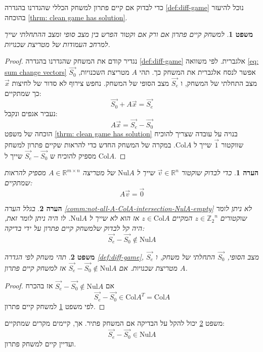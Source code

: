 \documentclass[12pt,leqno]{article}
\theoremstyle{theoremdd}
\newtheorem{theorem}{משפט}[section]
\newtheorem{comm}{הערה}[section]
\newcommand{\Zn}{{\mathbb{Z}_2}^n}
\newcommand{\Col}{\mathrm{Col}}
\newcommand{\Nul}{\mathrm{Nul}}
\begin{document}
כדי לבדוק אם קיים פתרון למשחק הכללי שהגדרנו 
בהגדרה 
\ref{def:diff-game}
נוכל להיעזר בהוכחה
\ref{thrm: clean game has solution}.
\begin{theorem}
    \label{thm:exist-sol-by-ColA}
    למשחק קיים פתרון אם ורק אם 
    וקטור הפרש בין מצב סופי ומצב ההתחלתי שייך למרחב 
    העמודות של מטריצת שכנויות.
\end{theorem}
\begin{proof}
    נגדיר קודם את המשחק 
    שהגדרנו 
    בהגדרה 
    \ref{def:diff-game}
    אלגברית.
    לפי משוואה 
    \ref{eq: sum change vectors}
    אפשר לנסח אלגברית את המשחק כך.
    תהי 
    $A$
    מטריצת השכנויות,
    $\vec{S_0}$
    מצב התחלתי של המשחק,
    ו
    $\vec{S_e}$
    מצב הסופי של המשחק.
    נחפש צירוף 
    לא סדור של לחיצות 
    $\vec x$
    כך שמתקיים:
    \[
        \vec{S_0} + A\vec{x} = \vec{S_e}
    \]
    נעביר אגפים ונקבל:
    \[
         A\vec{x} = \vec{S_e} - \vec{S_0}
    \]
    הוכחה
    של משפט 
    \ref{thrm: clean game has solution}
    בנויה על עובדה שצריך להוכיח
    שווקטור 
    $\vec{1}$
    שייך ל
    $\Col A$.
    במקרה של המשחק החדש כדי להראות
    שקיים פתרון למשחק 
    מספיק להוכיח 
    ש
    $\vec{S_e} - \vec{S_0}$
    שייך ל
    $\Col A$.
\end{proof}
\begin{comm}
    כדי לבדוק שוקטור 
    $\vec v \in \mathbb{R}^{n}$
    שייך 
    ל
    $\Nul A$
    של מטריצה 
    $A \in \mathbb{R}^{m \times n}$
    מספיק להראות שמתקיים:
    \[ A \vec v = \vec 0\]
\end{comm}
\begin{comm}
    בגלל 
    הערה 
    \ref{comm:not-all-A-ColA-intersection-NulA-empty}
    לא ניתן
    לומר שוקטורים 
    $z \in \Zn$
    המקיים 
    $z \in \Col A$
    אז הוא לא שייך 
    ל 
    $\Nul A$.
    לו היה ניתן לומר זאת,
    היה קל 
    לבדוק 
    שלמשחק קיים פתרון
    על ידי בדיקה:
    \[\vec{S_e} - \vec{S_0} \notin \Nul A\]
\end{comm}
\begin{theorem}
    \label{thm:easyier-way-to-find-exist-solution}
    תהי משחק לפי 
    הגדרה 
    \ref{def:diff-game},
    $\vec{S_e}$ 
    מצב הסופי,
    $\vec{S_0}$
    התחלתי של משחק,
    ו 
    $A$
    מטריצת שכנויות.
    אם
    $\vec{S_e} - \vec{S_0} \notin \Nul A$
    אז 
    למשחק קיים פתרון.
\end{theorem}
\begin{proof}
    אם 
    $\vec{S_e} - \vec{S_0} \notin \Nul A$
    אז בהכרח 
    \[\vec{S_e} - \vec{S_0} \in \Col A^T = \Col A\]
    לפי משפט 
    \ref{thm:exist-sol-by-ColA}
    למשחק קיים פתרון.
\end{proof}
משפט 
\ref{thm:easyier-way-to-find-exist-solution}
יכול להקל על הבדיקה אם המשחק פתיר.
אך, קיימים מקרים 
שמתקיים: 
\[\vec{S_e} - \vec{S_0} \in \Nul A\]
ועדיין קיים למשחק פתרון.
\end{document}

